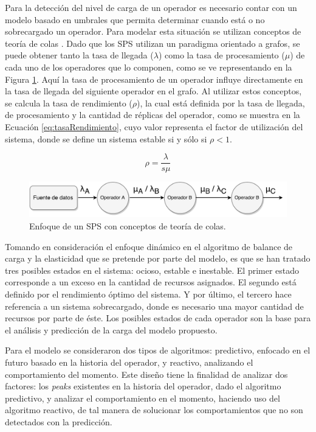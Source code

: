 Para la detecci\'on del nivel de carga de un operador es necesario contar con un modelo basado en umbrales que permita determinar cuando est\'a o no sobrecargado un operador. Para modelar esta situaci\'on se utilizan conceptos de teor\'ia de colas \citep{bose2013introduction}. Dado que los SPS utilizan un paradigma orientado a grafos, se puede obtener tanto la tasa de llegada ($\lambda$) como la tasa de procesamiento ($\mu$) de cada uno de los operadores que lo componen, como se ve representando en la Figura \ref{fig:analisisTeoriaColas}. Aqu\'i la tasa de procesamiento de un operador influye directamente en la tasa de llegada del siguiente operador en el grafo. Al utilizar estos conceptos, se calcula la tasa de rendimiento ($\rho$), la cual est\'a definida por la tasa de llegada, de procesamiento y la cantidad de r\'eplicas del operador, como se muestra en la Ecuaci\'on \ref{eq:tasaRendimiento}, cuyo valor representa el factor de utilizaci\'on del sistema, donde se define un sistema estable si y s\'olo si $\rho < 1$.

\begin{equation} \label{eq:tasaRendimiento}
	\rho = \frac{\lambda}{s \mu}
\end{equation}

\begin{figure}[!ht]
	\centering
		\includegraphics[scale=0.6]{images/AnalisisTeoriaColas.pdf}
	\caption{Enfoque de un SPS con conceptos de teor\'ia de colas.}
	\label{fig:analisisTeoriaColas}
\end{figure}

Tomando en consideraci\'on el enfoque din\'amico en el algoritmo de balance de carga y la elasticidad que se pretende por parte del modelo, es que se han tratado tres posibles estados en el sistema: ocioso, estable e inestable. El primer estado corresponde a un exceso en la cantidad de recursos asignados. El segundo est\'a definido por el rendimiento \'optimo del sistema. Y por \'ultimo, el tercero hace referencia a un sistema sobrecargado, donde es necesario una mayor cantidad de recursos por parte de \'este. Los posibles estados de cada operador son la base para el an\'alisis y predicci\'on de la carga del modelo propuesto.

Para el modelo se consideraron dos tipos de algoritmos: predictivo, enfocado en el futuro basado en la historia del operador, y reactivo, analizando el comportamiento del momento. Este dise\~no tiene la finalidad de analizar dos factores: los \textit{peaks} existentes en la historia del operador, dado el algoritmo predictivo, y analizar el comportamiento en el momento, haciendo uso del algoritmo reactivo, de tal manera de solucionar los comportamientos que no son detectados con la predicci\'on.

